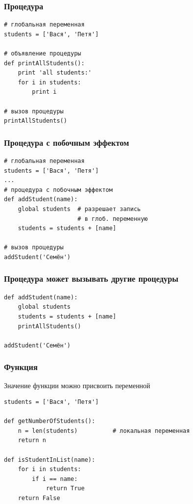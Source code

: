 {  

\begin{frame}[fragile]
  \frametitle{Процедура}
  \begin{verbatim}
# глобальная переменная
students = ['Вася', 'Петя']

# объявление процедуры
def printAllStudents():
    print 'all students:'
    for i in students:
        print i

# вызов процедуры
printAllStudents()
  \end{verbatim}
\end{frame}

\begin{frame}[fragile]
  \frametitle{Процедура с побочным эффектом}
  \begin{verbatim}
# глобальная переменная
students = ['Вася', 'Петя']
...
# процедура с побочным эффектом
def addStudent(name):
    global students  # разрешает запись
                     # в глоб. переменную
    students = students + [name]

# вызов процедуры
addStudent('Семён')
  \end{verbatim}
\end{frame}

\begin{frame}[fragile]
  \frametitle{Процедура может вызывать другие процедуры}
  \begin{verbatim}
def addStudent(name):
    global students
    students = students + [name]
    printAllStudents()

addStudent('Семён')
  \end{verbatim}
\end{frame}

\begin{frame}[fragile]
  \frametitle{Функция}
  Значение функции можно присвоить переменной
  \begin{verbatim}
students = ['Вася', 'Петя']

def getNumberOfStudents():
    n = len(students)          # локальная переменная
    return n

def isStudentInList(name):
    for i in students:
        if i == name:
            return True
    return False


\end{verbatim}
\end{frame}}
